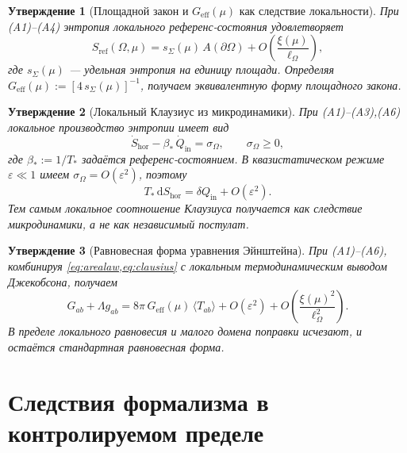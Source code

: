 \documentclass[11pt,a4paper]{article}
\newcommand{\dd}{\mathrm{d}}
\theoremstyle{definition}
\theoremstyle{plain}
\newtheorem{proposition}{Утверждение}[section]
\theoremstyle{remark}
\begin{document}
\begin{proposition}[Площадной закон и $G_{\mathrm{eff}}(\mu)$ как следствие локальности]\label{ax:arealaw}
При (A1)--(A4) энтропия локального референс-состояния удовлетворяет
\begin{equation}\label{eq:arealaw}
S_{\mathrm{ref}}(\Omega,\mu)
=
s_{\Sigma}(\mu)\,A(\partial\Omega)
+
O\!\left(\frac{\xi(\mu)}{\ell_\Omega}\right),
\end{equation}
где $s_{\Sigma}(\mu)$ — удельная энтропия на единицу площади.
Определяя
$G_{\mathrm{eff}}(\mu):=[4\,s_{\Sigma}(\mu)]^{-1}$,
получаем эквивалентную форму площадного закона.
\end{proposition}

\begin{proposition}[Локальный Клаузиус из микродинамики]\label{ax:clausius}
При (A1)--(A3),(A6) локальное производство энтропии имеет вид
\begin{equation}\label{eq:entropy_production_local}
\dot S_{\mathrm{hor}}-\beta_\ast\,\dot Q_{\mathrm{in}}=\sigma_\Omega,
\qquad
\sigma_\Omega\ge 0,
\end{equation}
где $\beta_\ast:=1/T_\ast$ задаётся референс-состоянием.
В квазистатическом режиме $\varepsilon\ll1$ имеем $\sigma_\Omega=O(\varepsilon^2)$, поэтому
\begin{equation}\label{eq:clausius}
T_\ast\,\dd S_{\mathrm{hor}}=\delta Q_{\mathrm{in}}+O(\varepsilon^2).
\end{equation}
Тем самым локальное соотношение Клаузиуса получается как следствие микродинамики, а не как независимый постулат.
\end{proposition}

\begin{proposition}[Равновесная форма уравнения Эйнштейна]\label{ax:einstein}
При (A1)--(A6), комбинируя \cref{eq:arealaw,eq:clausius} с локальным термодинамическим выводом Джекобсона,
получаем
\begin{equation}\label{eq:einstein}
G_{ab}+\Lambda g_{ab}
=
8\pi\,G_{\mathrm{eff}}(\mu)\,\langle T_{ab}\rangle
+
O(\varepsilon^2)
+
O\!\left(\frac{\xi(\mu)^2}{\ell_\Omega^2}\right).
\end{equation}
В пределе локального равновесия и малого домена поправки исчезают, и остаётся стандартная равновесная форма.
\end{proposition}


\section{Следствия формализма в контролируемом пределе}
\label{sec:derivations}
\end{document}
